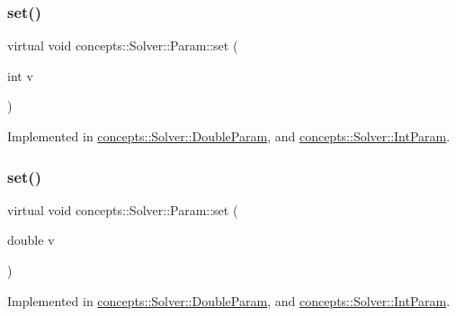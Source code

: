 \subsubsection{\texorpdfstring{set()}{set()}\hspace{0.1cm}{\footnotesize\ttfamily [2/3]}}
{\footnotesize\ttfamily virtual void concepts\+::\+Solver\+::\+Param\+::set (\begin{DoxyParamCaption}\item[{int}]{v }\end{DoxyParamCaption})\hspace{0.3cm}{\ttfamily [pure virtual]}}



Implemented in \hyperlink{classconcepts_1_1_solver_1_1_double_param_a4648d672a792ded79977319d968fd497}{concepts\+::\+Solver\+::\+Double\+Param}, and \hyperlink{classconcepts_1_1_solver_1_1_int_param_aad283b6869373847cf9543e889f9fc91}{concepts\+::\+Solver\+::\+Int\+Param}.

\mbox{\label{classconcepts_1_1_solver_1_1_param_a35b7155d8f6db1b3e63e60b883beebcb}} 
\subsubsection{\texorpdfstring{set()}{set()}\hspace{0.1cm}{\footnotesize\ttfamily [3/3]}}
{\footnotesize\ttfamily virtual void concepts\+::\+Solver\+::\+Param\+::set (\begin{DoxyParamCaption}\item[{double}]{v }\end{DoxyParamCaption})\hspace{0.3cm}{\ttfamily [pure virtual]}}



Implemented in \hyperlink{classconcepts_1_1_solver_1_1_double_param_a5a27e7e058121b520d71472e8de549db}{concepts\+::\+Solver\+::\+Double\+Param}, and \hyperlink{classconcepts_1_1_solver_1_1_int_param_aa678f7356cd371ac1bc11e86e0109ae7}{concepts\+::\+Solver\+::\+Int\+Param}.

\mbox{\label{classconcepts_1_1_solver_1_1_param_abcbd9c68852499c7be9ebf6a2d22f4b5}} 
